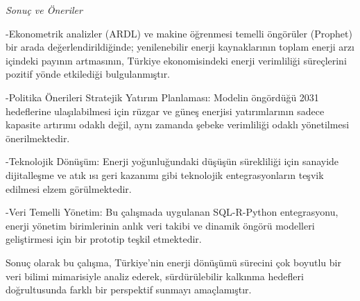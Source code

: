 \documentclass[
]{article}
\begin{document}
\emph{Sonuç ve Öneriler}

-Ekonometrik analizler (ARDL) ve makine öğrenmesi temelli öngörüler
(Prophet) bir arada değerlendirildiğinde; yenilenebilir enerji
kaynaklarının toplam enerji arzı içindeki payının artmasının, Türkiye
ekonomisindeki enerji verimliliği süreçlerini pozitif yönde etkilediği
bulgulanmıştır.

-Politika Önerileri Stratejik Yatırım Planlaması: Modelin öngördüğü 2031
hedeflerine ulaşılabilmesi için rüzgar ve güneş enerjisi yatırımlarının
sadece kapasite artırımı odaklı değil, aynı zamanda şebeke verimliliği
odaklı yönetilmesi önerilmektedir.

-Teknolojik Dönüşüm: Enerji yoğunluğundaki düşüşün sürekliliği için
sanayide dijitalleşme ve atık ısı geri kazanımı gibi teknolojik
entegrasyonların teşvik edilmesi elzem görülmektedir.

-Veri Temelli Yönetim: Bu çalışmada uygulanan SQL-R-Python entegrasyonu,
enerji yönetim birimlerinin anlık veri takibi ve dinamik öngörü
modelleri geliştirmesi için bir prototip teşkil etmektedir.

Sonuç olarak bu çalışma, Türkiye'nin enerji dönüşümü sürecini çok
boyutlu bir veri bilimi mimarisiyle analiz ederek, sürdürülebilir
kalkınma hedefleri doğrultusunda farklı bir perspektif sunmayı
amaçlamıştır.
\end{document}
